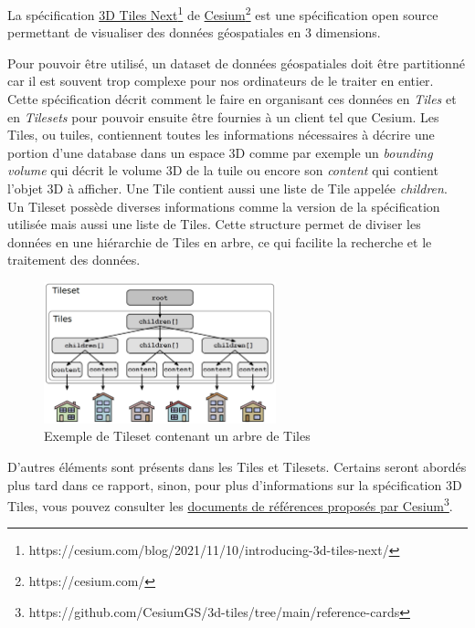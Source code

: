 La spécification \href{https://cesium.com/blog/2021/11/10/introducing-3d-tiles-next/}{3D Tiles Next}\footnote{https://cesium.com/blog/2021/11/10/introducing-3d-tiles-next/} de \href{https://cesium.com/}{Cesium}\footnote{https://cesium.com/} est une spécification open source permettant de visualiser des données géospatiales en 3 dimensions.

Pour pouvoir être utilisé, un dataset de données géospatiales doit être partitionné car il est souvent trop complexe pour nos ordinateurs de le traiter en entier. Cette spécification décrit comment le faire en organisant ces données en \textit{Tiles} et en \textit{Tilesets} pour pouvoir ensuite être fournies à un client tel que Cesium. Les Tiles, ou tuiles, contiennent toutes les informations nécessaires à décrire une portion d'une database dans un espace 3D comme par exemple un \textit{bounding volume} qui décrit le volume 3D de la tuile ou encore son \textit{content} qui contient l'objet 3D à afficher. Une Tile contient aussi une liste de Tile appelée \textit{children}. Un Tileset possède diverses informations comme la version de la spécification utilisée mais aussi une liste de Tiles. Cette structure permet de diviser les données en une hiérarchie de Tiles en arbre, ce qui facilite la recherche et le traitement des données.

\begin{figure}[H]
    \centering
    \includegraphics[width=0.6\textwidth]{assets/figures/Tilesets.png}
    \caption{Exemple de Tileset contenant un arbre de Tiles \cite{3d-tiles-reference-card-v1}}
    \label{fig:Tilesets}
\end{figure}

D'autres éléments sont présents dans les Tiles et Tilesets. Certains seront abordés plus tard dans ce rapport, sinon, pour plus d'informations sur la spécification 3D Tiles, vous pouvez consulter les \href{https://github.com/CesiumGS/3d-tiles/tree/main/reference-cards}{documents de références proposés par Cesium}\footnote{https://github.com/CesiumGS/3d-tiles/tree/main/reference-cards}.
